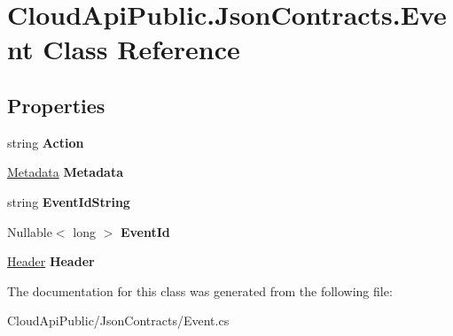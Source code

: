 \hypertarget{class_cloud_api_public_1_1_json_contracts_1_1_event}{\section{Cloud\-Api\-Public.\-Json\-Contracts.\-Event Class Reference}
\label{class_cloud_api_public_1_1_json_contracts_1_1_event}
}
\subsection*{Properties}
\begin{DoxyCompactItemize}
\item 
\hypertarget{class_cloud_api_public_1_1_json_contracts_1_1_event_a62ca34e9f2f124ae973e3b0d8ad1251c}{string {\bfseries Action}}\label{class_cloud_api_public_1_1_json_contracts_1_1_event_a62ca34e9f2f124ae973e3b0d8ad1251c}

\item 
\hypertarget{class_cloud_api_public_1_1_json_contracts_1_1_event_a95d293458b6742727b255c904f19726a}{\hyperlink{class_cloud_api_public_1_1_json_contracts_1_1_metadata}{Metadata} {\bfseries Metadata}}\label{class_cloud_api_public_1_1_json_contracts_1_1_event_a95d293458b6742727b255c904f19726a}

\item 
\hypertarget{class_cloud_api_public_1_1_json_contracts_1_1_event_ae519af893c225e3a5c87a90d916e11cb}{string {\bfseries Event\-Id\-String}}\label{class_cloud_api_public_1_1_json_contracts_1_1_event_ae519af893c225e3a5c87a90d916e11cb}

\item 
\hypertarget{class_cloud_api_public_1_1_json_contracts_1_1_event_ae40c19f64bb0795383ebb55d61907134}{Nullable$<$ long $>$ {\bfseries Event\-Id}}\label{class_cloud_api_public_1_1_json_contracts_1_1_event_ae40c19f64bb0795383ebb55d61907134}

\item 
\hypertarget{class_cloud_api_public_1_1_json_contracts_1_1_event_ae9bb01cf7a7d6c6aaa7b345c8556bb09}{\hyperlink{class_cloud_api_public_1_1_json_contracts_1_1_header}{Header} {\bfseries Header}}\label{class_cloud_api_public_1_1_json_contracts_1_1_event_ae9bb01cf7a7d6c6aaa7b345c8556bb09}

\end{DoxyCompactItemize}


The documentation for this class was generated from the following file\-:\begin{DoxyCompactItemize}
\item 
Cloud\-Api\-Public/\-Json\-Contracts/Event.\-cs\end{DoxyCompactItemize}
